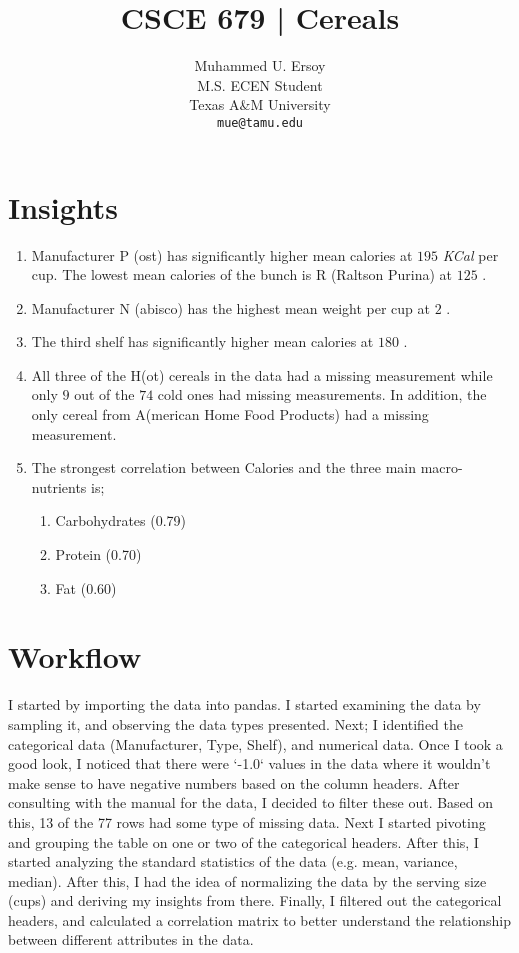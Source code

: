 \documentclass{article}
\title{CSCE 679 | Cereals}
\author{%
  Muhammed U. Ersoy\\
  M.S. ECEN Student\\
  Texas A\&M University\\
  \texttt{mue@tamu.edu} \\
 }
\begin{document}
\maketitle

\section{Insights}
    \begin{enumerate}
        \item Manufacturer P (ost) has significantly higher mean calories at $195$ \textit{KCal} per cup. The lowest mean calories of the bunch is R (Raltson Purina) at $125$ .
        \item Manufacturer N (abisco) has the highest mean weight per cup at $2$ .
        \item The third shelf has significantly higher mean calories at $180$ .
        \item All three of the H(ot) cereals in the data had a missing measurement while only $9$ out of the $74$ cold ones had missing measurements. In addition, the only cereal from A(merican Home Food Products) had a missing measurement.
        \item The strongest correlation between Calories and the three main macro-nutrients is;
            \begin{enumerate}
                \item Carbohydrates (0.79)
                \item Protein (0.70)
                \item Fat (0.60)
            \end{enumerate}
    \end{enumerate}

\section{Workflow}
I started by importing the data into pandas. I started examining the data by sampling it, and observing the data types presented.
Next; I identified the categorical data (Manufacturer, Type, Shelf), and numerical data. Once I took a good look, I noticed that there were `-1.0` values in the data where it wouldn't make sense to have negative numbers based on the column headers.
After consulting with the manual for the data, I decided to filter these out. Based on this, 13 of the 77 rows had some type of missing data. Next I started pivoting and grouping the table on one or two of the categorical headers. After this, I started analyzing the standard statistics of the
data (e.g. mean, variance, median). After this, I had the idea of normalizing the data by the serving size (cups) and deriving my insights from there. Finally, I filtered out the categorical headers, and calculated a correlation matrix to better understand the relationship between different attributes in the data.
\end{document}
